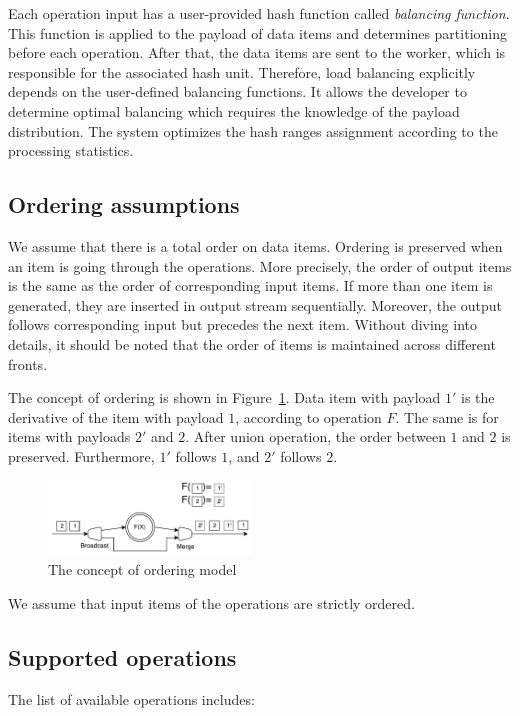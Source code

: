 Each operation input has a user-provided hash function called {\it balancing function}. This function is applied to the payload of data items and determines partitioning before each operation. After that, the data items are sent to the worker, which is responsible for the associated hash unit. Therefore, load balancing explicitly depends on the user-defined balancing functions. It allows the developer to determine optimal balancing which requires the knowledge of the payload distribution. The system optimizes the hash ranges assignment according to the processing statistics. 

\subsection{Ordering assumptions}
We assume that there is a total order on data items. Ordering is preserved when an item is going through the operations. More precisely, the order of output items is the same as the order of corresponding input items. If more than one item is generated, they are inserted in output stream sequentially. Moreover, the output follows corresponding input but precedes the next item. Without diving into details, it should be noted that the order of items is maintained across different fronts.

The concept of ordering is shown in Figure~\ref{ordering}. Data item with payload $1'$ is the derivative of the item with payload $1$, according to operation $F$. The same is for items with payloads $2'$ and $2$. After union operation, the order between $1$ and $2$ is preserved. Furthermore, $1'$ follows $1$, and $2'$ follows $2$.  
\begin{figure}[htbp]
  \centering
  \includegraphics[width=0.48\textwidth]{pics/ordering}
  \caption{The concept of ordering model}
  \label {ordering}
\end{figure}

We assume that input items of the operations are strictly ordered.

\subsection{Supported operations}
The list of available operations includes:

